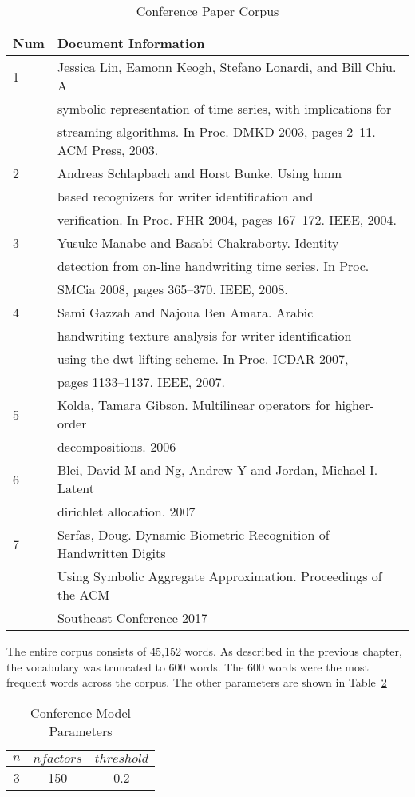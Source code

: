\documentclass[../ut-dissertation.tex]{subfiles}
\begin{document}
\begin{table}[p]
  \centering
  \caption{Conference Paper Corpus}\label{tab:conference_corpus}
  \begin{tabular}{|l|l|}
    \hline
    Num & Document Information\\
    \hline
    1 & Jessica Lin, Eamonn Keogh, Stefano Lonardi, and Bill Chiu. A\\
      & symbolic representation of time series, with implications for\\
      & streaming algorithms. In Proc. DMKD 2003, pages 2–11. ACM
        Press, 2003.\\
    \hline
    2 & Andreas Schlapbach and Horst Bunke. Using hmm\\
      & based recognizers for writer identification and\\
      & verification. In Proc. FHR 2004, pages 167–172. IEEE, 2004.\\
    \hline
    3 & Yusuke Manabe and Basabi Chakraborty. Identity\\
      & detection from on-line handwriting time series. In Proc.\\
      & SMCia 2008, pages 365–370. IEEE, 2008.\\
    \hline
    4 & Sami Gazzah and Najoua Ben Amara. Arabic \\
      & handwriting texture analysis for writer identification\\
      & using the dwt-lifting scheme. In Proc. ICDAR 2007,\\
      & pages 1133–1137. IEEE, 2007.\\
    \hline
    5 & Kolda, Tamara Gibson. Multilinear operators for higher-order \\
      & decompositions. 2006\\
    \hline
    6 & Blei, David M and Ng, Andrew Y and Jordan, Michael I. Latent\\
      & dirichlet allocation. 2007\\
    \hline
    7 & Serfas, Doug. Dynamic Biometric Recognition of Handwritten Digits\\
      & Using Symbolic Aggregate Approximation. Proceedings of the ACM\\
      & Southeast Conference 2017\\
    \hline
  \end{tabular}
\end{table}

The entire corpus consists of 45,152 words.  As described in the
previous chapter, the vocabulary was truncated to 600 words.  The 600
words were the most frequent words across the corpus.  The other
parameters are shown in Table~\ref{tab:model_parameters}
\begin{table}[p]
  \centering
  \caption{Conference Model Parameters}\label{tab:model_parameters}
  \begin{tabular}{ccc}
    \hline
    $n$ & $nfactors$ & $threshold$\\
    \hline
    3 & 150 & 0.2\\
    \hline
  \end{tabular}
\end{table}
\end{document}
